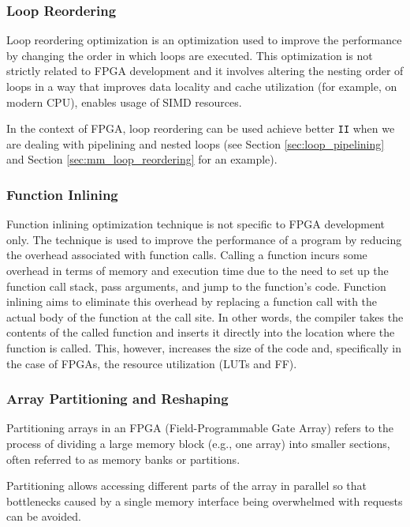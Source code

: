 \documentclass[a4paper, twoside]{report}
\theoremstyle{definition}
\numberwithin{equation}{section}
\begin{document}
\subsubsection{Loop Reordering}

Loop reordering optimization is an optimization used to improve the performance
by changing the order in which loops are executed.
This optimization is not strictly related to FPGA development and
it involves altering the nesting order of loops in a way that improves data locality and
cache utilization (for example, on modern CPU), enables usage of SIMD resources.


In the context of FPGA, loop reordering can be used achieve better \texttt{II}
when we are dealing with pipelining and nested loops (see Section \ref{sec:loop_pipelining} and Section \ref{sec:mm_loop_reordering} for an example).


\subsubsection{Function Inlining}

Function inlining optimization technique is not specific to FPGA development only.
The technique is used to improve the performance of a program by reducing the overhead associated with function calls.
Calling a function incurs some overhead in terms of memory and execution time due to the need to set up the function call stack, pass arguments, and jump to the function's code.
Function inlining aims to eliminate this overhead by replacing a function call with the actual body of the function at the call site.
In other words, the compiler takes the contents of the called function and inserts it directly into the location where the function is called.
This, however, increases the size of the code and, specifically in the case of FPGAs, the resource utilization (LUTs and FF).

\subsubsection{Array Partitioning and Reshaping}

Partitioning arrays in an FPGA (Field-Programmable Gate Array) refers to the
process of dividing a large memory block (e.g., one array) into smaller sections, often referred to
as memory banks or partitions.

Partitioning allows accessing different parts of the array in parallel
so that bottlenecks caused by a single memory interface being overwhelmed with requests
can be avoided.
\end{document}
